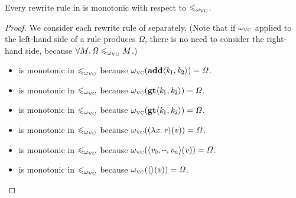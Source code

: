 \subsubsection{}


\begin{lemma} \label{lem:vc-monotonic}
Every rewrite rule in \versecalc{} is monotonic with respect to $\mathrel{\leqslant_{\omega_{\scriptscriptstyle\mathrm{VC}}}}$.
\end{lemma}

\begin{proof}
We consider each rewrite rule of \versecalc{} separately.
(Note that if $\omega_{\scriptscriptstyle\mathrm{VC}}$ applied to the left-hand side of a rule produces \ensuremath{\mathit{\Omega}}, there is no need to consider the right-hand side, because $\forall M .\, \mathit{\Omega} \mathrel{\leqslant_{\omega_{\scriptscriptstyle\mathrm{VC}}}} M$.)

\begin{itemize}
\item {} is monotonic in $\mathrel{\leqslant_{\omega_{\scriptscriptstyle\mathrm{VC}}}}$
because $\omega_{\scriptscriptstyle\mathrm{VC}}(\textbf{add}\langle\mathit{k}_{\mathrm{1}},\mathit{k}_{\mathrm{2}}\rangle) = \mathit{\Omega}$.

\item {} is monotonic in $\mathrel{\leqslant_{\omega_{\scriptscriptstyle\mathrm{VC}}}}$
because $\omega_{\scriptscriptstyle\mathrm{VC}}(\textbf{gt}\langle\mathit{k}_{\mathrm{1}},\mathit{k}_{\mathrm{2}}\rangle) = \mathit{\Omega}$.

\item {} is monotonic in $\mathrel{\leqslant_{\omega_{\scriptscriptstyle\mathrm{VC}}}}$
because $\omega_{\scriptscriptstyle\mathrm{VC}}(\textbf{gt}\langle\mathit{k}_{\mathrm{1}},\mathit{k}_{\mathrm{2}}\rangle) = \mathit{\Omega}$.

\item {} is monotonic in $\mathrel{\leqslant_{\omega_{\scriptscriptstyle\mathrm{VC}}}}$
because $\omega_{\scriptscriptstyle\mathrm{VC}}((\lambda\mathit{x}.\,\mathit{e})(\mathit{v})) = \mathit{\Omega}$.

\item {} is monotonic in $\mathrel{\leqslant_{\omega_{\scriptscriptstyle\mathrm{VC}}}}$
because $\omegavc(\ensuremath{\langle{}\Varid{v}_{\mathrm{0}},\mydots,\Varid{v}_{\Varid{n}}\rangle(\Varid{v})}) = \ensuremath{\mathit{\Omega}}$.

\item {} is monotonic in $\mathrel{\leqslant_{\omega_{\scriptscriptstyle\mathrm{VC}}}}$
because $\omega_{\scriptscriptstyle\mathrm{VC}}(\langle\rangle(\mathit{v})) = \mathit{\Omega}$.


\end{itemize}
\end{proof}
